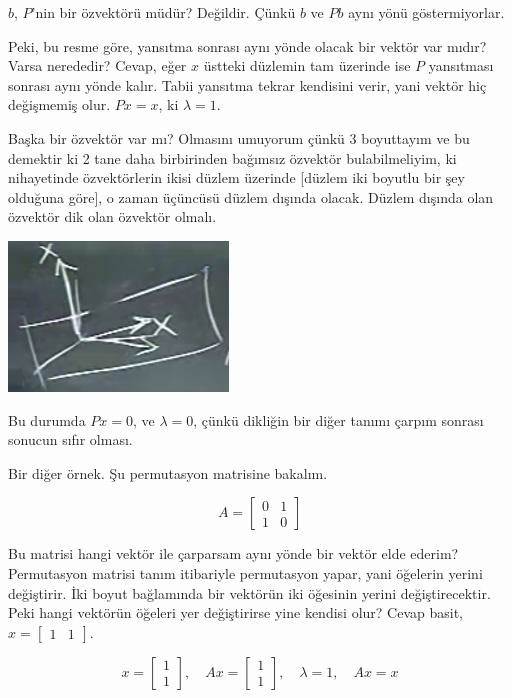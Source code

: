 \documentclass[12pt,fleqn]{article}\usepackage{../../common}
\begin{document}
$b$, $P$'nin bir özvektörü müdür? Değildir. Çünkü $b$ ve $Pb$ aynı yönü
göstermiyorlar. 

Peki, bu resme göre, yansıtma sonrası aynı yönde olacak bir vektör var
mıdır? Varsa nerededir? Cevap, eğer $x$ üstteki düzlemin tam üzerinde ise
$P$ yansıtması sonrası aynı yönde kalır. Tabii yansıtma tekrar kendisini
verir, yani vektör hiç değişmemiş olur. $Px = x$, ki $\lambda = 1$.

Başka bir özvektör var mı? Olmasını umuyorum çünkü 3 boyuttayım ve bu
demektir ki 2 tane daha birbirinden bağımsız özvektör bulabilmeliyim, ki
nihayetinde özvektörlerin ikisi düzlem üzerinde [düzlem iki boyutlu bir şey
olduğuna göre], o zaman üçüncüsü düzlem dışında olacak. Düzlem dışında olan
özvektör dik olan özvektör olmalı.

\includegraphics[height=4cm]{21_2.png}

Bu durumda $Px = 0$, ve $\lambda = 0$, çünkü dikliğin bir diğer tanımı
çarpım sonrası sonucun sıfır olması. 

Bir diğer örnek. Şu permutasyon matrisine bakalım. 

$$ 
A = \left[\begin{array}{cc}
0 & 1 \\
1 & 0
\end{array}\right]
 $$

Bu matrisi hangi vektör ile çarparsam aynı yönde bir vektör elde ederim?
Permutasyon matrisi tanım itibariyle permutasyon yapar, yani öğelerin
yerini değiştirir. İki boyut bağlamında bir vektörün iki öğesinin yerini
değiştirecektir. Peki hangi vektörün öğeleri yer değiştirirse yine kendisi
olur? Cevap basit, $x = \left[\begin{array}{cc} 1 & 1 \end{array}\right]$. 

$$ 
x = \left[\begin{array}{c} 1 \\ 1 \end{array}\right], \quad
Ax = \left[\begin{array}{c} 1 \\ 1 \end{array}\right],  \quad
\lambda = 1,  \quad
Ax = x
$$
\end{document}
